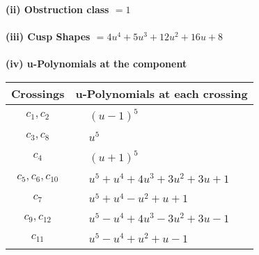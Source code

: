 \documentclass[1p]{elsarticle_modified}
\theoremstyle{definition}
\begin{document}
\flushleft \textbf{(ii) Obstruction class $= 1$}\\~\\
\flushleft \textbf{(iii) Cusp Shapes $= 4 u^4+5 u^3+12 u^2+16 u+8$}\\~\\
\newpage\renewcommand{\arraystretch}{1}
\flushleft \textbf{(iv) u-Polynomials at the component}\newline \\
\begin{tabular}{m{50pt}|m{274pt}}
Crossings & \hspace{64pt}u-Polynomials at each crossing \\
\hline $$\begin{aligned}c_{1},c_{2}\end{aligned}$$&$\begin{aligned}
&(u-1)^5
\end{aligned}$\\
\hline $$\begin{aligned}c_{3},c_{8}\end{aligned}$$&$\begin{aligned}
&u^5
\end{aligned}$\\
\hline $$\begin{aligned}c_{4}\end{aligned}$$&$\begin{aligned}
&(u+1)^5
\end{aligned}$\\
\hline $$\begin{aligned}c_{5},c_{6},c_{10}\end{aligned}$$&$\begin{aligned}
&u^5+u^4+4 u^3+3 u^2+3 u+1
\end{aligned}$\\
\hline $$\begin{aligned}c_{7}\end{aligned}$$&$\begin{aligned}
&u^5+u^4- u^2+u+1
\end{aligned}$\\
\hline $$\begin{aligned}c_{9},c_{12}\end{aligned}$$&$\begin{aligned}
&u^5- u^4+4 u^3-3 u^2+3 u-1
\end{aligned}$\\
\hline $$\begin{aligned}c_{11}\end{aligned}$$&$\begin{aligned}
&u^5- u^4+u^2+u-1
\end{aligned}$\\
\hline
\end{tabular}\\~\\
\end{document}
